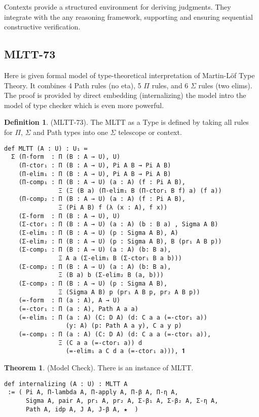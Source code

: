 \documentclass{article}
\theoremstyle{definition}
\newtheorem{definition}{Definition}
\newtheorem{theorem}{Theorem}
\begin{document}
Contexts provide a structured environment for deriving judgments.
They integrate with the any reasoning framework, supporting and ensuring
sequential constructive verification.

\subsection*{MLTT-73}
Here is given formal model of type-theoretical interpretation of Martin-Löf Type Theory.
It combines 4 Path rules (no eta), 5 $\Pi$ rules, and 6 $\Sigma$ rules (two elims).
The proof is provided by direct embedding (internalizing) the model intro the model
of type checker which is even more powerful.

\begin{definition} (MLTT-73).
The MLTT as a Type is defined by taking all rules
for $\Pi$, $\Sigma$ and Path types into one $\Sigma$ telescope or context.
\begin{lstlisting}[mathescape=true]
def MLTT (A : U) : U₁ ≔
  Σ (Π-form  : Π (B : A → U), U)
    (Π-ctor₁ : Π (B : A → U), Pi A B → Pi A B)
    (Π-elim₁ : Π (B : A → U), Pi A B → Pi A B)
    (Π-comp₁ : Π (B : A → U) (a : A) (f : Pi A B),
               Ξ (Ξ (B a) (Π-elim₁ B (Π-ctor₁ B f) a) (f a))
    (Π-comp₂ : Π (B : A → U) (a : A) (f : Pi A B),
               Ξ (Pi A B) f (λ (x : A), f x))
    (Σ-form  : Π (B : A → U), U)
    (Σ-ctor₁ : Π (B : A → U) (a : A) (b : B a) , Sigma A B)
    (Σ-elim₁ : Π (B : A → U) (p : Sigma A B), A)
    (Σ-elim₂ : Π (B : A → U) (p : Sigma A B), B (pr₁ A B p))
    (Σ-comp₁ : Π (B : A → U) (a : A) (b: B a),
               Ξ A a (Σ-elim₁ B (Σ-ctor₁ B a b)))
    (Σ-comp₂ : Π (B : A → U) (a : A) (b: B a),
               Ξ (B a) b (Σ-elim₂ B (a, b)))
    (Σ-comp₃ : Π (B : A → U) (p : Sigma A B),
               Ξ (Sigma A B) p (pr₁ A B p, pr₂ A B p))
    (=-form  : Π (a : A), A → U)
    (=-ctor₁ : Π (a : A), Path A a a)
    (=-elim₁ : Π (a : A) (C: D A) (d: C a a (=-ctor₁ a))
                 (y: A) (p: Path A a y), C a y p)
    (=-comp₁ : Π (a : A) (C: D A) (d: C a a (=-ctor₁ a)),
               Ξ (C a a (=-ctor₁ a)) d
                 (=-elim₁ a C d a (=-ctor₁ a))), 𝟏
\end{lstlisting}
\end{definition}

\begin{theorem} (Model Check).
There is an instance of MLTT.
\begin{lstlisting}
def internalizing (A : U) : MLTT A
 := ( Pi A, Π-lambda A, Π-apply A, Π-β A, Π-η A,
      Sigma A, pair A, pr₁ A, pr₂ A, Σ-β₁ A, Σ-β₂ A, Σ-η A,
      Path A, idp A, J A, J-β A, ★  )
\end{lstlisting}
\end{theorem}
\end{document}
